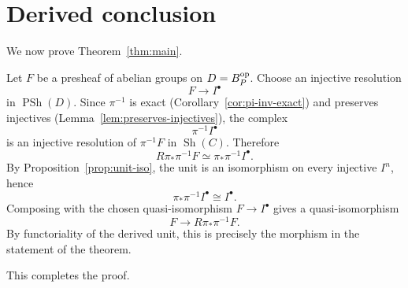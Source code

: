 \documentclass{article}
\theoremstyle{remark}
\DeclareMathOperator{\Sh}{Sh}
\DeclareMathOperator{\PSh}{PSh}
\begin{document}
\section{Derived conclusion}\label{sec:derived}

We now prove Theorem~\ref{thm:main}.

Let $F$ be a presheaf of abelian groups on $D=B_P^{\rm op}$.  Choose an injective resolution
\[
F\longrightarrow I^\bullet
\]
in $\PSh(D)$.  Since $\pi^{-1}$ is exact (Corollary~\ref{cor:pi-inv-exact}) and preserves injectives (Lemma~\ref{lem:preserves-injectives}), the complex
\[
\pi^{-1}I^\bullet
\]
is an injective resolution of $\pi^{-1}F$ in $\Sh(C)$.  Therefore
\[
R\pi_*\pi^{-1}F
\simeq
\pi_*\pi^{-1}I^\bullet.
\]
By Proposition~\ref{prop:unit-iso}, the unit is an isomorphism on every injective $I^n$, hence
\[
\pi_*\pi^{-1}I^\bullet \cong I^\bullet.
\]
Composing with the chosen quasi-isomorphism $F\to I^\bullet$ gives a quasi-isomorphism
\[
F\longrightarrow R\pi_*\pi^{-1}F.
\]
By functoriality of the derived unit, this is precisely the morphism in the statement of the theorem.

This completes the proof.
\end{document}
